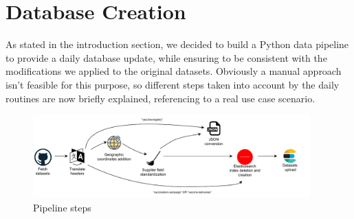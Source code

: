\documentclass{article}[IEEEtran]
\begin{document}
\newpage

\section{Database Creation}\label{sec:creation}

As stated in the introduction section, we decided to build a Python\cite{b5} data pipeline to provide a daily database update, while ensuring to be consistent with the modifications we applied to the original datasets. Obviously a manual approach isn't feasible for this purpose, so different steps taken into account by the daily routines are now briefly explained, referencing to a real use case scenario.

\begin{figure}[H]
\begin{center}
    \includegraphics[width=0.95\textwidth]{pipeline.pdf}
    \caption{Pipeline steps}
\end{center}
\end{figure}
\end{document}
